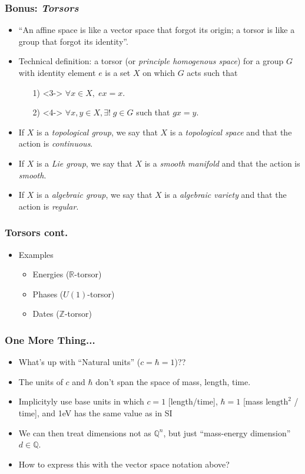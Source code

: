 \documentclass{beamer}
\begin{document}
\begin{frame}
    \frametitle{Bonus: \textit{Torsors}}
    \begin{itemize}
        \item<1-> ``An affine space is like a vector space that forgot its origin; a torsor is like a group that forgot its identity''.
        \item<2-> Technical definition: a torsor (or \textit{principle homogenous space}) for a group $G$ with identity element $e$ is a set $X$ on which $G$ acts such that
        \begin{itemize}
            \item[1)]<3-> $\forall x \in X, \; ex = x$.
            \item[2)]<4-> $\forall x,y\in X, \exists ! \; g\in G$ such that $gx = y$.
        \end{itemize} 
        \item<5-> If $X$ is a \textit{topological group}, we say  that $X$ is a \textit{topological space} and that the action is \textit{continuous}. 
        \item<6-> If $X$ is a \textit{Lie group}, we say  that $X$ is a \textit{smooth manifold} and that the action is \textit{smooth}.
        \item<7-> If $X$ is a \textit{algebraic group}, we say  that $X$ is a \textit{algebraic variety} and that the action is \textit{regular}.  
    \end{itemize}
\end{frame}

\begin{frame}
    \frametitle{Torsors cont.}
    \begin{itemize}
        \item<1-> Examples
        \begin{itemize}
            \item<2-> Energies ($\mathbb{R}$-torsor)
            \item<3-> Phases ($U(1)$-torsor)
            \item<4-> Dates ($\mathbb{Z}$-torsor)
        \end{itemize}
    \end{itemize}
\end{frame}

\begin{frame}
    \frametitle{One More Thing...}
    \begin{itemize}
        \item<1-> What's up with ``Natural units'' ($c = \hbar = 1$)??
        \item<2-> The units of $c$ and $\hbar$ don't span the space of {mass, length, time}.
        \item<3-> Implicityly use base units in which $c = 1$ [length/time], $\hbar = 1$ [mass $\text{length}^2$ / time], and 1eV has the same value as in SI
        \item<4-> We can then treat dimensions not as $\mathbb{Q}^n$, but just ``mass-energy dimension'' $d\in\mathbb{Q}$.
        \item<5-> How to express this with the vector space notation above?
    \end{itemize}
\end{frame}
\end{document}
